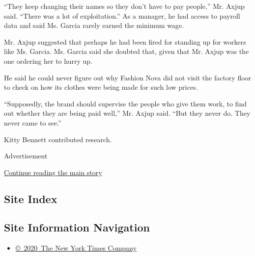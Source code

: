 ``They keep changing their names so they don't have to pay people,'' Mr.
Axjup said. ``There was a lot of exploitation.'' As a manager, he had
access to payroll data and said Ms. Garcia rarely earned the minimum
wage.

Mr. Axjup suggested that perhaps he had been fired for standing up for
workers like Ms. Garcia. Ms. Garcia said she doubted that, given that
Mr. Axjup was the one ordering her to hurry up.

He said he could never figure out why Fashion Nova did not visit the
factory floor to check on how its clothes were being made for such low
prices.

``Supposedly, the brand should supervise the people who give them work,
to find out whether they are being paid well,'' Mr. Axjup said. ``But
they never do. They never came to see.''

Kitty Bennett contributed research.

Advertisement

\protect\hyperlink{after-bottom}{Continue reading the main story}

\hypertarget{site-index}{%
\subsection{Site Index}\label{site-index}}

\hypertarget{site-information-navigation}{%
\subsection{Site Information
Navigation}\label{site-information-navigation}}

\begin{itemize}
\tightlist
\item
  \href{https://help.nytimes.com/hc/en-us/articles/115014792127-Copyright-notice}{©~2020~The
  New York Times Company}
\end{itemize}

